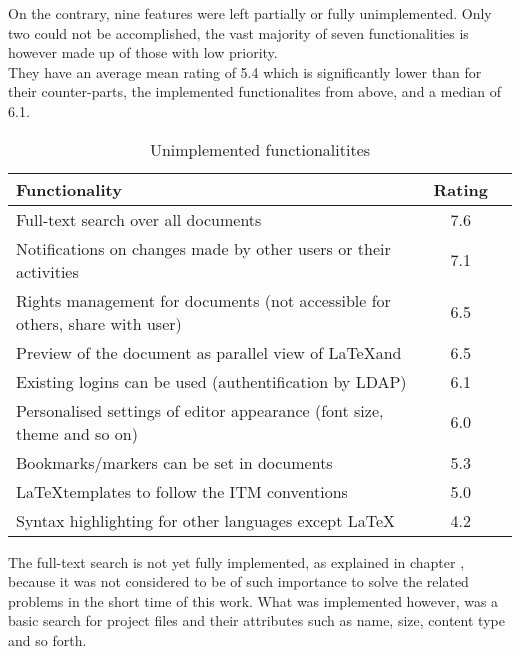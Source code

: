 \pagebreak

On the contrary, nine features were left partially or fully unimplemented. Only two  could not be accomplished, the vast majority of seven functionalities is however made up of those with low priority. \\ They have an average mean rating of 5.4 which is significantly lower than for their counter-parts, the implemented functionalites from above, and a median of 6.1.

\begin{table}[H] %
	\begin{center}
		\footnotesize
		\setlength\extrarowheight{5pt}
		\begin{tabular}{ p{11cm} cp{1.5cm} }
		  	\textbf{Functionality} 	  														& \textbf{Rating} \\
			\hline
			Full-text search over all documents												& 7.6 \\
			Notifications on changes made by other users or their activities				& 7.1 \\
			\hline
			Rights management for documents (not accessible for others, share with user)	& 6.5 \\
			Preview of the document as parallel view of \LaTeX and \fileformat{PDF}			& 6.5 \\
			Existing logins can be used (authentification by LDAP)							& 6.1 \\
			Personalised settings of editor appearance (font size, theme and so on)			& 6.0 \\
			Bookmarks/markers can be set in documents				 						& 5.3 \\
			\LaTeX templates to follow the ITM conventions									& 5.0 \\
			Syntax highlighting for other languages except \LaTeX							& 4.2 \\
		\end{tabular}
		\caption{Unimplemented functionalitites}
		\label{unimplemented-functionalitites}
	\end{center}
\end{table}

The full-text search is not yet fully implemented, as explained in chapter , because it was not considered to be of such importance to solve the related problems in the short time of this work. What was implemented however, was a basic search for project files and their attributes such as name, size, content type and so forth.

